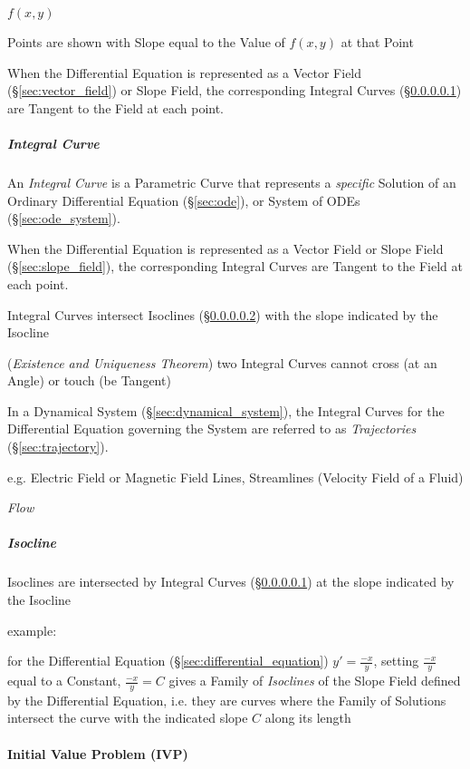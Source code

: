 $f(x,y)$

Points are shown with Slope equal to the Value of $f(x,y)$ at that Point

When the Differential Equation is represented as a Vector Field
(\S\ref{sec:vector_field}) or Slope Field, the corresponding Integral Curves
(\S\ref{sec:integral_curve}) are Tangent to the Field at each point.



\subparagraph{Integral Curve}\label{sec:integral_curve}\hfill

An \emph{Integral Curve} is a Parametric Curve that represents a
\emph{specific} Solution of an Ordinary Differential Equation
(\S\ref{sec:ode}), or System of ODEs (\S\ref{sec:ode_system}).

When the Differential Equation is represented as a Vector Field or Slope Field
(\S\ref{sec:slope_field}), the corresponding Integral Curves are Tangent to the
Field at each point.

Integral Curves intersect Isoclines (\S\ref{sec:isocline}) with the slope
indicated by the Isocline

(\emph{Existence and Uniqueness Theorem}) two Integral Curves cannot cross (at
an Angle) or touch (be Tangent)

In a Dynamical System (\S\ref{sec:dynamical_system}), the Integral Curves for
the Differential Equation governing the System are referred to as
\emph{Trajectories} (\S\ref{sec:trajectory}).

e.g. Electric Field or Magnetic Field Lines, Streamlines (Velocity Field of a
Fluid)

\emph{Flow}



\subparagraph{Isocline}\label{sec:isocline}\hfill

Isoclines are intersected by Integral Curves (\S\ref{sec:integral_curve}) at
the slope indicated by the Isocline

example:

for the Differential Equation (\S\ref{sec:differential_equation}) $y' =
\frac{-x}{y}$, setting $\frac{-x}{y}$ equal to a Constant, $\frac{-x}{y} = C$
gives a Family of \emph{Isoclines} of the Slope Field defined by the
Differential Equation, i.e. they are curves where the Family of Solutions
intersect the curve with the indicated slope $C$ along its length



\paragraph{Initial Value Problem (IVP)}\label{sec:ivp}\hfill

